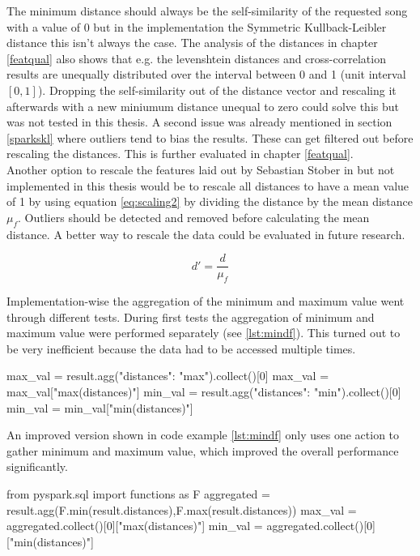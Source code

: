 \noindent The minimum distance should always be the self-similarity of the requested song with a value of 0 but in the implementation the Symmetric Kullback-Leibler distance this isn't always the case. The analysis of the distances in chapter \ref{featqual} also shows that e.g. the levenshtein distances and cross-correlation results are unequally distributed over the interval between 0 and 1 (unit interval $[0,1]$). Dropping the self-similarity out of the distance vector and rescaling it afterwards with a new miniumum distance unequal to zero could solve this but was not tested in this thesis. A second issue was already mentioned in section \ref{sparkskl} where outliers tend to bias the results. These can get filtered out before rescaling the distances. This is further evaluated in chapter \ref{featqual}.\\
Another option to rescale the features laid out by Sebastian Stober in \cite[pp. 543ff]{musicdata} but not implemented in this thesis would be to rescale all distances to have a mean value of 1 by using equation \ref{eq:scaling2} by dividing the distance by the mean distance $\mu_f$. Outliers should be detected and removed before calculating the mean distance. 
A better way to rescale the data could be evaluated in future research. 

\begin{equation} \label{eq:scaling2}
d' = \frac{d}{\mu_f}
\end{equation} 

Implementation-wise the aggregation of the minimum and maximum value went through different tests. During first tests the aggregation of minimum and maximum value were performed separately (see \ref{lst:mindf}). This turned out to be very inefficient because the data had to be accessed multiple times. 

\begin{pythonCode}[frame=single,label={lst:mindf},caption={Minimum and maximum aggregation separate},captionpos=b]
max_val = result.agg({"distances": "max"}).collect()[0]
max_val = max_val["max(distances)"]
min_val = result.agg({"distances": "min"}).collect()[0]
min_val = min_val["min(distances)"]
\end{pythonCode}

An improved version shown in code example \ref{lst:mindf} only uses one action to gather minimum and maximum value, which improved the overall performance significantly. 

\begin{pythonCode}[frame=single,label={lst:mindf},caption={Minimum and maximum aggregation optimized},captionpos=b]
from pyspark.sql import functions as F
aggregated = result.agg(F.min(result.distances),F.max(result.distances))
max_val = aggregated.collect()[0]["max(distances)"]
min_val = aggregated.collect()[0]["min(distances)"]
\end{pythonCode}

